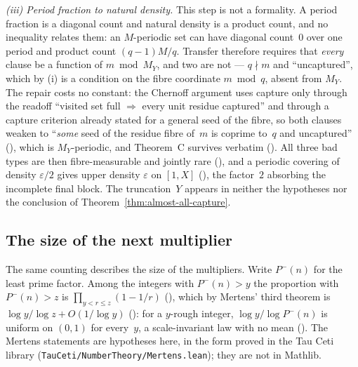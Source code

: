 \documentclass[10pt,a4paper]{article}
\begin{document}
\emph{(iii) Period fraction to natural density.}  This step is not a
formality.  A period fraction is a diagonal count and natural density is a
product count, and no inequality relates them: an $M$-periodic set can have
diagonal count~$0$ over one period and product count $(q{-}1)M/q$.  Transfer
therefore requires that \emph{every} clause be a function of $m\bmod M_Y$,
and two are not --- $q\nmid m$ and ``uncaptured'', which by (i) is a
condition on the fibre coordinate $m\bmod q$, absent from $M_Y$.  The repair
costs no constant: the Chernoff argument uses capture only through the
readoff ``visited set full $\Rightarrow$ every unit residue captured'' and
through a capture criterion already stated for a general seed of the fibre,
so both clauses weaken to ``\emph{some} seed of the residue fibre of~$m$ is
coprime to~$q$ and uncaptured''
(), which is
$M_Y$-periodic, and Theorem~C survives verbatim
().  All three bad
types are then fibre-measurable and jointly rare
(), and a periodic
covering of density $\varepsilon/2$ gives upper density $\varepsilon$ on
$[1,X]$
(), the
factor~$2$ absorbing the incomplete final block.  The truncation~$Y$ appears
in neither the hypotheses nor the conclusion of
Theorem~\ref{thm:almost-all-capture}.

\subsection{The size of the next multiplier}
\label{sec:scale-law}

The same counting describes the size of the multipliers.  Write $P^-(n)$
for the least prime factor.  Among the integers with $P^-(n)>y$ the
proportion with $P^-(n)>z$ is $\prod_{y<r\le z}(1-1/r)$
(), which by
Mertens' third theorem is $\log y/\log z+O(1/\log y)$
(): for a $y$-rough integer,
$\log y/\log P^-(n)$ is uniform on $(0,1)$ for every~$y$, a scale-invariant
law with no mean
().  The
Mertens statements are hypotheses here, in the form proved in the Tau Ceti
library (\texttt{TauCeti/NumberTheory/Mertens.lean}); they are not in
Mathlib.
\end{document}
